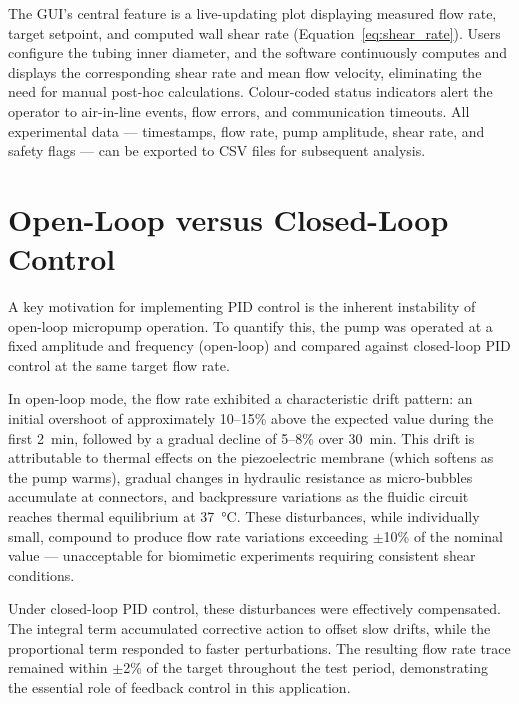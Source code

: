 The GUI's central feature is a live-updating plot displaying measured flow rate, target setpoint, and computed wall shear rate (Equation~\ref{eq:shear_rate}). Users configure the tubing inner diameter, and the software continuously computes and displays the corresponding shear rate and mean flow velocity, eliminating the need for manual post-hoc calculations. Colour-coded status indicators alert the operator to air-in-line events, flow errors, and communication timeouts. All experimental data --- timestamps, flow rate, pump amplitude, shear rate, and safety flags --- can be exported to CSV files for subsequent analysis.

\section{Open-Loop versus Closed-Loop Control}
\label{sec:open_vs_closed}

A key motivation for implementing PID control is the inherent instability of open-loop micropump operation. To quantify this, the pump was operated at a fixed amplitude and frequency (open-loop) and compared against closed-loop PID control at the same target flow rate.

In open-loop mode, the flow rate exhibited a characteristic drift pattern: an initial overshoot of approximately 10--15\% above the expected value during the first \SI{2}{\minute}, followed by a gradual decline of 5--8\% over \SI{30}{\minute}. This drift is attributable to thermal effects on the piezoelectric membrane (which softens as the pump warms), gradual changes in hydraulic resistance as micro-bubbles accumulate at connectors, and backpressure variations as the fluidic circuit reaches thermal equilibrium at \SI{37}{\celsius}. These disturbances, while individually small, compound to produce flow rate variations exceeding $\pm$10\% of the nominal value --- unacceptable for biomimetic experiments requiring consistent shear conditions.

Under closed-loop PID control, these disturbances were effectively compensated. The integral term accumulated corrective action to offset slow drifts, while the proportional term responded to faster perturbations. The resulting flow rate trace remained within $\pm$2\% of the target throughout the test period, demonstrating the essential role of feedback control in this application.

